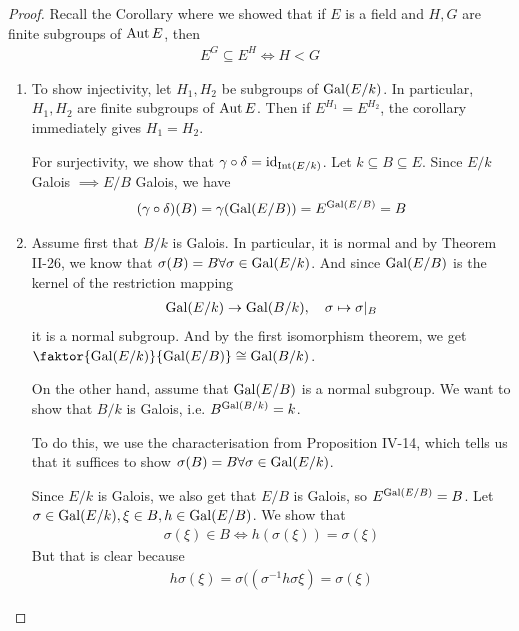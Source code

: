 \begin{proof}
  Recall the Corollary %
  where we showed that if $E$ is a field and $H,G$ are finite subgroups of $\operatorname{Aut} E$, then
  \begin{align*}
    E^{G} \subseteq E^{H} \iff H < G
  \end{align*}

  \begin{enumerate}
    \item To show injectivity, let $H_1,H_2$ be subgroups of $\operatorname{Gal}(E/k)$. In particular, $H_1,H_2$ are finite subgroups of $\operatorname{Aut} E$.
      Then if $E^{H_1} = E^{H_2}$, the corollary immediately gives $H_1 = H_2$.

      For surjectivity, we show that $\gamma \circ \delta = \operatorname{id}_{\operatorname{Int}(E/k)}$.
      Let $k \subseteq B \subseteq E$. Since $E/k$ Galois $\implies E/B$ Galois, we have
      \begin{align*}
        (\gamma \circ \delta)(B) = \gamma(\operatorname{Gal}(E/B)) = E^{\operatorname{Gal}(E/B)} = B
      \end{align*}

    \item Assume first that $B/k$ is Galois. In particular, it is normal and by Theorem II-26, we know that $\sigma(B) = B \forall  \sigma \in \operatorname{Gal}(E/k)$.
      And since $\operatorname{Gal}(E/B)$ is the kernel of the restriction mapping
      \begin{align*}
        \operatorname{Gal}(E/k) \to  \operatorname{Gal}(B/k), \quad \sigma \mapsto  \sigma|_B
      \end{align*}
      it is a normal subgroup. 
      And by the first isomorphism theorem, we get $\faktor{\Gal(E/k)}{\Gal(E/B)} \iso \Gal(B/k)$.

      On the other hand, assume that $\operatorname{Gal}(E/B)$ is a normal subgroup. We want to show that $B/k$ is Galois, i.e. $B^{\operatorname{Gal}(B/k)} = k$.

      To do this, we use the characterisation from Proposition IV-14, which tells us that it suffices to show
      $\sigma(B) = B \forall \sigma \in \operatorname{Gal}(E/k)$.

      Since $E/k$ is Galois, we also get that $E/B$ is Galois, so $E^{\operatorname{Gal}(E/B)} = B$.
      Let $\sigma \in \operatorname{Gal}(E/k), \xi \in B, h \in \operatorname{Gal}(E/B)$.
      We show that
      \begin{align*}
        \sigma(\xi) \in B \iff  h(\sigma (\xi)) = \sigma(\xi)
      \end{align*}
      But that is clear because
      \begin{align*}
        h \sigma(\xi) = \sigma( (\sigma^{-1}h \sigma \xi) = \sigma(\xi)
      \end{align*}
  \end{enumerate}
\end{proof}

